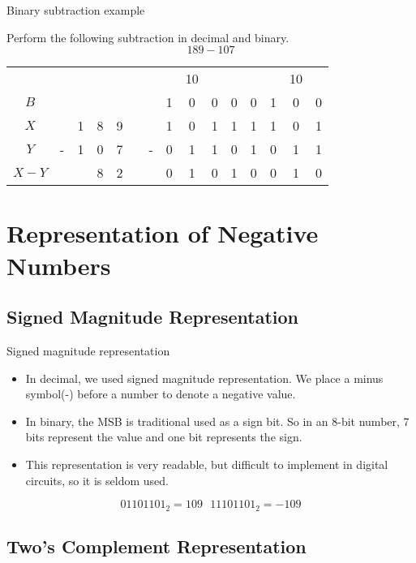 \begin{frame}{Binary subtraction example}
  \begin{example}
    Perform the following subtraction in decimal and binary.
    $$189 - 107$$
  \end{example}
\end{frame}

\begin{tabular}{ccccccccccccccc}
  $ $   &   &   &   &   & &   &   & 10&   &   &   &   & 10&   \\
  $B$   &   &   &   &   & &   & 1 & 0 & 0 & 0 & 0 & 1 & 0 & 0 \\
  $X$   &   & 1 & 8 & 9 & &   & 1 & 0 & 1 & 1 & 1 & 1 & 0 & 1 \\
  $Y$   & - & 1 & 0 & 7 & & - & 0 & 1 & 1 & 0 & 1 & 0 & 1 & 1 \\
  \hline
  $X-Y$ &   &   & 8 & 2 & &   & 0 & 1 & 0 & 1 & 0 & 0 & 1 & 0 \\
\end{tabular}

\section{Representation of Negative Numbers}

\subsection{Signed Magnitude Representation}

\begin{frame}{Signed magnitude representation}
  \begin{itemize}
    \item In decimal, we used signed magnitude representation.  We place a minus symbol(-) before a number to denote a negative value.
    \item In binary, the MSB is traditional used as a sign bit.  So in an 8-bit number, 7 bits represent the value and one bit represents the sign.
    \item This representation is very readable, but difficult to implement in digital circuits, so it is seldom used.
  \end{itemize}
  \begin{example}
    $$01101101_2 = 109 \text{    } 11101101_2 = -109$$
  \end{example}
\end{frame}

\subsection{Two's Complement Representation}

